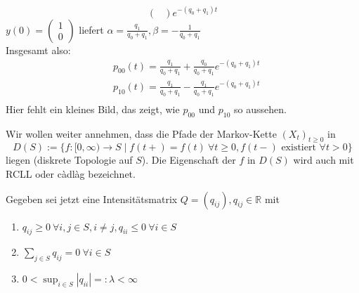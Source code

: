 \documentclass[a4paper,twoside,DIV15,BCOR12mm]{scrbook}
\begin{document}
\begin{beispiel}
\[\begin{pmatrix}
  \end{pmatrix} e^{-(q_0+q_1)t}
  \]
  $y(0)=\begin{pmatrix} 1 \\ 0\end{pmatrix}$ liefert $\alpha=\frac{q_1}{q_0+q_1},
  \beta=-\frac{1}{q_0+q_1}$ \\
  Insgesamt also:
  \begin{align*}
    & p_{00}(t)=\frac{q_1}{q_0+q_1}+\frac{q_0}{q_0+q_1}e^{-(q_0+q_1)t} \\
    & p_{10}(t)=\frac{q_1}{q_0+q_1}-\frac{q_1}{q_0+q_1}e^{-(q_0+q_1)t} \\
  \end{align*}
  Hier fehlt ein kleines Bild, das zeigt, wie $p_{00}$ und $p_{10}$ so aussehen.

  Wir wollen weiter annehmen, dass die Pfade der Markov-Kette $(X_t)_{t\geq 0}$ in
  \[
  D(S):=\{f:[0,\infty)\longrightarrow S\mid f(t+)=f(t) \ \forall t\geq0,f(t-) \text{ existiert } \forall t>0\}
  \]
  liegen (diskrete Topologie auf $S$). Die Eigenschaft der $f$ in $D(S)$ wird auch mit RCLL oder
  càdlàg bezeichnet. \\
\end{beispiel}
  Gegeben sei jetzt eine Intensitätsmatrix $Q=(q_{ij}),q_{ij}\in\mathbb R$ mit
  \begin{enumerate}[\hspace{1em}(Q1)]
\item  $q_{ij}\geq0\ \forall i,j\in S, i\neq j, q_{ii}\leq 0 \ \forall i\in S$
\item  $\sum_{j\in S}q_{ij}=0 \ \forall i\in S$
\item  $0<\sup_{i\in S}|q_{ii}|=:\lambda<\infty$
\end{enumerate}
\end{document}
